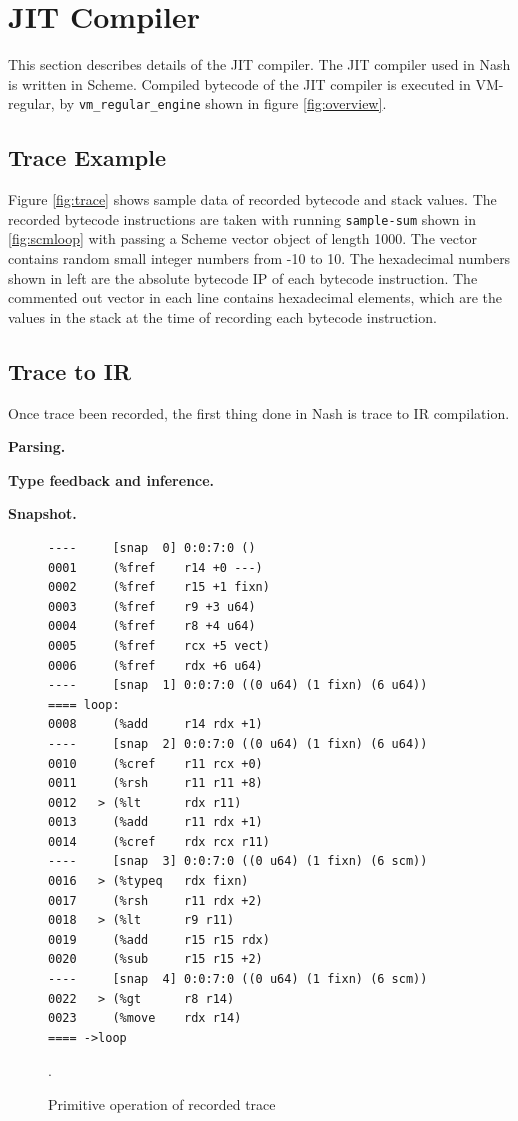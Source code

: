 \documentclass[preprint, numbers]{sigplanconf}
\begin{document}
\section{JIT Compiler}
\label{sec:compiler}

This section describes details of the JIT compiler. The JIT compiler used in
Nash is written in Scheme. Compiled bytecode of the JIT compiler is executed
in VM-regular, by \texttt{vm\_regular\_engine} shown in figure
\hyperref[fig:overview]{\ref{fig:overview}}.

\subsection{Trace Example}
Figure \hyperref[fig:trace]{\ref{fig:trace}} shows sample data of recorded
bytecode and stack values. The recorded bytecode instructions are taken with
running \texttt{sample-sum} shown in \hyperref[fig:scmloop]{\ref{fig:scmloop}}
with passing a Scheme vector object of length 1000. The vector contains random
small integer numbers from -10 to 10. The hexadecimal numbers shown in
left are the absolute bytecode IP of each bytecode instruction.  The commented
out vector in each line contains hexadecimal elements, which are the values in
the stack at the time of recording each bytecode instruction.

\subsection{Trace to IR}
Once trace been recorded, the first thing done in Nash is trace to IR
 compilation.

\textbf{Parsing.}

\textbf{Type feedback and inference.}

\textbf{Snapshot.}

\begin{figure}
\begin{verbatim}
----     [snap  0] 0:0:7:0 ()
0001     (%fref    r14 +0 ---)
0002     (%fref    r15 +1 fixn)
0003     (%fref    r9 +3 u64)
0004     (%fref    r8 +4 u64)
0005     (%fref    rcx +5 vect)
0006     (%fref    rdx +6 u64)
----     [snap  1] 0:0:7:0 ((0 u64) (1 fixn) (6 u64))
==== loop:
0008     (%add     r14 rdx +1)
----     [snap  2] 0:0:7:0 ((0 u64) (1 fixn) (6 u64))
0010     (%cref    r11 rcx +0)
0011     (%rsh     r11 r11 +8)
0012   > (%lt      rdx r11)
0013     (%add     r11 rdx +1)
0014     (%cref    rdx rcx r11)
----     [snap  3] 0:0:7:0 ((0 u64) (1 fixn) (6 scm))
0016   > (%typeq   rdx fixn)
0017     (%rsh     r11 rdx +2)
0018   > (%lt      r9 r11)
0019     (%add     r15 r15 rdx)
0020     (%sub     r15 r15 +2)
----     [snap  4] 0:0:7:0 ((0 u64) (1 fixn) (6 scm))
0022   > (%gt      r8 r14)
0023     (%move    rdx r14)
==== ->loop
\end{verbatim}
\caption{Primitive operation of recorded trace}.
\label{fig:primops}
\end{figure}
\end{document}
